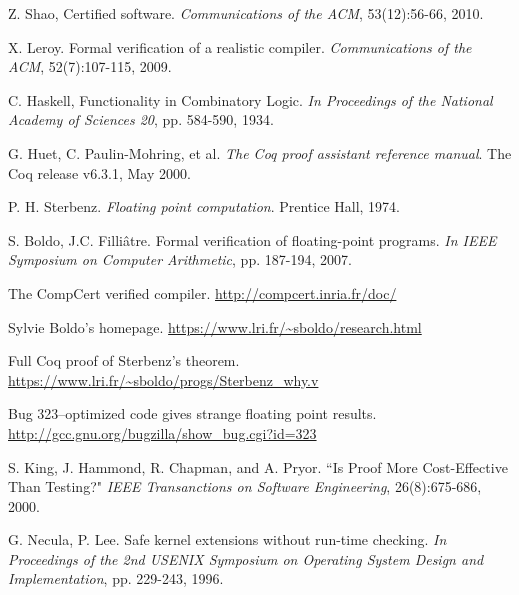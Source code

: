 \documentclass[10pt, conference, compsocconf]{IEEEtran}
\begin{document}
%
%
%
\begin{thebibliography}{1}

  
  Z. Shao, Certified software. \emph{Communications of the ACM}, 53(12):56-66, 2010.

   X. Leroy. Formal verification of a realistic compiler. \emph{Communications of the ACM}, 52(7):107-115, 2009.

   C. Haskell, Functionality in Combinatory Logic. \emph{In Proceedings of the National Academy of Sciences 20}, pp. 584-590, 1934.

   G. Huet, C. Paulin-Mohring, et al. \emph{The Coq proof assistant reference manual}. The Coq release v6.3.1, May 2000.
    
   P. H. Sterbenz. \emph{Floating point computation}. Prentice Hall, 1974.
    
    S. Boldo, J.C. Filli\^atre. Formal verification of floating-point programs. \emph{In IEEE Symposium on Computer Arithmetic}, pp. 187-194, 2007.
    
     The CompCert verified compiler. \url{http://compcert.inria.fr/doc/}
    
    Sylvie Boldo's homepage. \url{https://www.lri.fr/~sboldo/research.html}
  
    Full Coq proof of Sterbenz's theorem. \url{https://www.lri.fr/~sboldo/progs/Sterbenz\_why.v}
   
    Bug 323--optimized code gives strange floating point results. \url{http://gcc.gnu.org/bugzilla/show\_bug.cgi?id=323}
   
     S. King, J. Hammond, R. Chapman, and A. Pryor. ``Is Proof More Cost-Effective Than Testing?" \emph{IEEE Transanctions on Software Engineering}, 26(8):675-686, 2000.

   G. Necula, P. Lee. Safe kernel extensions without run-time checking. \emph{In Proceedings of the 2nd USENIX Symposium on Operating System Design and Implementation}, pp. 229-243, 1996.


\end{thebibliography}
\end{document}
